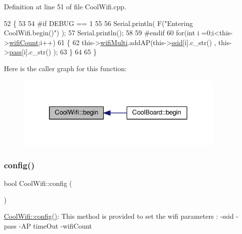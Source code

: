 Definition at line 51 of file Cool\+Wifi.\+cpp.


\begin{DoxyCode}
52 \{ 
53 
54 \textcolor{preprocessor}{#if DEBUG == 1 }
55 
56     Serial.println( F(\textcolor{stringliteral}{"Entering CoolWifi.begin()"}) );
57     Serial.println();
58 
59 \textcolor{preprocessor}{#endif}
60     \textcolor{keywordflow}{for}(\textcolor{keywordtype}{int} i =0;i<this->\hyperlink{class_cool_wifi_ab133bd92fcb895b884deecd6678592e4}{wifiCount};i++)
61     \{
62          this->\hyperlink{class_cool_wifi_a7862a8c0d7239877e2956c14a368aab8}{wifiMulti}.addAP(this->\hyperlink{class_cool_wifi_a893b21d0fed821438733bba2e73fb4c2}{ssid}[i].c\_str() , this->\hyperlink{class_cool_wifi_a0c3332a149245aaad060b32593a54c9b}{pass}[i].c\_str() );    
63     \}
64     
65 \}
\end{DoxyCode}
Here is the caller graph for this function\+:\nopagebreak
\begin{figure}[H]
\begin{center}
\leavevmode
\includegraphics[width=291pt]{d7/d29/class_cool_wifi_a46942fed90e475112cc10b78a32e7aaa_icgraph}
\end{center}
\end{figure}
\mbox{\label{class_cool_wifi_a4eb2f6b9b09dd588964b88b6c70122c0}} 
\subsubsection{\texorpdfstring{config()}{config()}\hspace{0.1cm}{\footnotesize\ttfamily [1/2]}}
{\footnotesize\ttfamily bool Cool\+Wifi\+::config (\begin{DoxyParamCaption}{ }\end{DoxyParamCaption})}

\hyperlink{class_cool_wifi_a4eb2f6b9b09dd588964b88b6c70122c0}{Cool\+Wifi\+::config()}\+: This method is provided to set the wifi parameters \+: -\/ssid -\/pass -\/\+AP time\+Out -\/wifi\+Count

